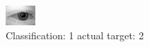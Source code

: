 \begin{figure}[h!]
\begin{center}
\includegraphics[width=0.60\columnwidth]{figures/ID500_class_1_target_2.png}
\end{center}
\caption{ Classification: 1 actual target: 2}
\label{fig:ID500_class_1_target_2}
\end{figure}
